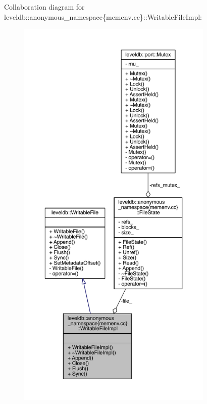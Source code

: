 Collaboration diagram for leveldb\+:\+:anonymous\+\_\+namespace\{memenv.\+cc\}\+:\+:Writable\+File\+Impl\+:
\nopagebreak
\begin{figure}[H]
\begin{center}
\leavevmode
\includegraphics[height=550pt]{classleveldb_1_1anonymous__namespace_02memenv_8cc_03_1_1_writable_file_impl__coll__graph}
\end{center}
\end{figure}
